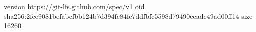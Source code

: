 version https://git-lfs.github.com/spec/v1
oid sha256:2fce9081befabcfbb124b7d394fc84fc7ddfbfc5598d79490eeadc49ad00ff14
size 16260
